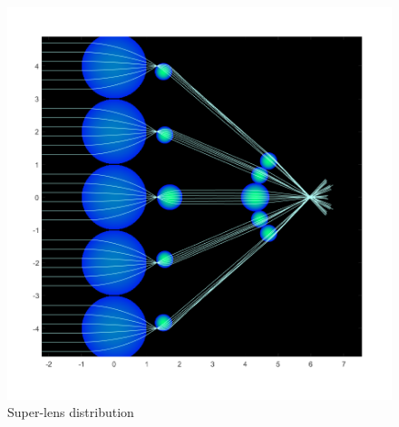 \begin{figure}[H]
    \centering
    \includegraphics[width=\columnwidth]{Figures/MYSuperlens_final.png}
    \caption{Super-lens distribution}
    \label{fig:superlens_v1}
\end{figure}